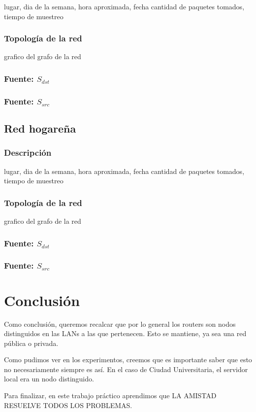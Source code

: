 \documentclass[10pt, a4paper]{article}
\begin{document}
lugar, dia de la semana, hora aproximada, fecha
cantidad de paquetes tomados, tiempo de muestreo

\subsubsection{Topología de la red}

grafico del grafo de la red

\subsubsection{Fuente: $S_{dst}$}

\subsubsection{Fuente: $S_{src}$}

\subsection{Red hogareña}

\subsubsection{Descripción}

lugar, dia de la semana, hora aproximada, fecha
cantidad de paquetes tomados, tiempo de muestreo

\subsubsection{Topología de la red}

grafico del grafo de la red

\subsubsection{Fuente: $S_{dst}$}

\subsubsection{Fuente: $S_{src}$}

\section{Conclusión}
Como conclusión, queremos recalcar que por lo general los routers son nodos distinguidos en las LANs a las que pertenecen. Esto se mantiene, ya sea una red pública o privada.

Como pudimos ver en los experimentos, creemos que es importante saber que esto no necesariamente siempre es así. En el caso de Ciudad Universitaria, el servidor local era un nodo distinguido.

Para finalizar, en este trabajo práctico aprendimos que LA AMISTAD RESUELVE TODOS LOS PROBLEMAS.
\end{document}
